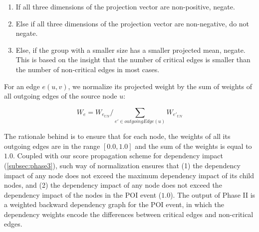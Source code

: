 {\begin{enumerate}[label=\Roman*, noitemsep, topsep=1pt, partopsep=1pt, listparindent=\parindent, leftmargin=*]

\item If all three dimensions of the projection vector are non-positive, negate.
\item Else if all three dimensions of the projection vector are non-negative, do not negate.
\item Else, 
if the group with a smaller size has a smaller projected mean, negate.
This is based on the insight that the number of critical edges is smaller than the number of non-critical edges in most cases.

\end{enumerate}
}




For an edge $e(u, v)$, we normalize its projected weight by the sum of weights of all outgoing edges of the source node $u$:

\begin{equation}
    \label{eq:local-weight-normalization}
    W_e = W_{e_{UN}}/\sum_{e' \in outgoingEdge(u)} W_{e'_{UN}}
\end{equation}

The rationale behind is to ensure that for each node, the weights of all its outgoing edges are in the range $[0.0, 1.0]$ and the sum of the weights is equal to $1.0$.
%
Coupled with our score propagation scheme for dependency impact (\cref{subsec:phase3}), such way of normalization ensures that (1) the dependency impact of any node does not exceed the maximum dependency impact of its child nodes, and (2) the dependency impact of any node does not exceed the dependency impact of the nodes in the POI event (\ie $1.0$).
%
The output of Phase II is a weighted backward dependency graph for the POI event, in which the dependency weights encode the differences between critical edges and non-critical edges.




